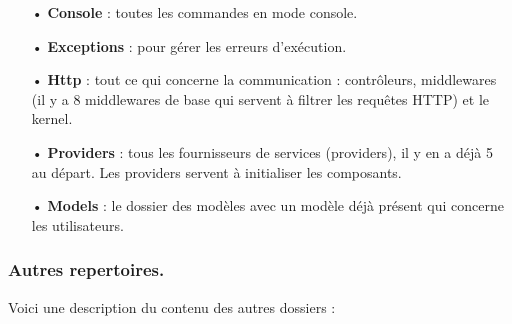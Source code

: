 \documentclass[12pt,a4paper]{article}
\begin{document}
\begin{itemize}

\item[•] \textbf{Console} : toutes les commandes en mode console.\\

\item[•] \textbf{Exceptions} : pour gérer les erreurs d'exécution.\\

\item[•] \textbf{Http} : tout ce qui concerne la communication : contrôleurs, middlewares (il y a 8 middlewares de base qui servent à filtrer les requêtes HTTP) et le kernel.\\

\item[•] \textbf{Providers} : tous les fournisseurs de services (providers), il y en a 
déjà 5 au départ. Les providers servent à initialiser les composants.\\

\item[•] \textbf{Models} : le dossier des modèles avec un modèle déjà présent qui concerne les utilisateurs.\\

\end{itemize}


\newpage


\subsubsection{Autres repertoires.}

Voici une description du contenu des autres dossiers :
\end{document}
